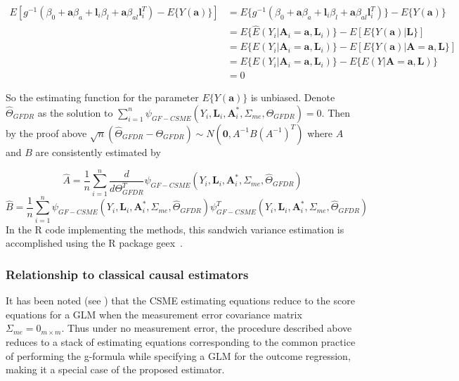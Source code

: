 \documentclass[12pt]{article}
\begin{document}
\begin{align*}
E[g^{-1}(\beta_{0} + \bm{a}\beta_{a} + \bm{l}_{i}\beta_{l} +
        \bm{a}\beta_{al}\bm{l}_{i}^{T}) - E \{ Y(\bm{a}) \}] &= E \{ g^{-1}(\beta_{0} + \bm{a}\beta_{a} + \bm{l}_{i}\beta_{l} +
        \bm{a}\beta_{al}\bm{l}_{i}^{T}) \} - E \{ Y(\bm{a}) \} \\
&= E \{ \hat{E}(Y_{i} | \bm{A}_{i} = \bm{a}, \bm{L}_{i}) \} - E[E \{ Y(\bm{a}) | \bm{L} \}] \\
&= E \{ E(Y_{i} | \bm{A}_{i} = \bm{a}, \bm{L}_{i}) \} - E[E \{ Y(\bm{a}) | \bm{A} = \bm{a}, \bm{L} \}] \\
&= E \{ E(Y_{i} | \bm{A}_{i} = \bm{a}, \bm{L}_{i}) \} - E\{ E(Y | \bm{A} = \bm{a}, \bm{L})\} \\
&=0
\end{align*}

So the estimating function for the parameter $E \{ Y(\bm{a}) \}$ is unbiased. Denote $\hat{\Theta}_{GFDR}$ as the solution to $\sum_{i=1}^{n} \psi_{GF-CSME}(Y_{i}, \bm{L}_{i}, \bm{A}^{*}_{i}, \Sigma_{me}, \hat{\Theta}_{GFDR}) = 0$. Then by the proof above $\sqrt{n}(\hat{\Theta}_{GFDR} - \Theta_{GFDR}) \sim N(\textbf{0}, A^{-1}B(A^{-1})^{T})$ where $A$ and $B$ are consistently estimated by

\begin{equation*}
\hat{A} = \frac{1}{n} \sum_{i=1}^{n} \frac{d}{d\Theta_{GFDR}^{T}} \psi_{GF-CSME}(Y_{i}, \bm{L}_{i}, \bm{A}^{*}_{i}, \Sigma_{me}, \hat{\Theta}_{GFDR})
\end{equation*}
\begin{equation*}
\hat{B} = \frac{1}{n} \sum_{i=1}^{n} \psi_{GF-CSME}(Y_{i}, \bm{L}_{i}, \bm{A}^{*}_{i}, \Sigma_{me}, \hat{\Theta}_{GFDR}) \psi^{T}_{GF-CSME}(Y_{i}, \bm{L}_{i}, \bm{A}^{*}_{i}, \Sigma_{me}, \hat{\Theta}_{GFDR})
\end{equation*}
In the R code implementing the methods, this sandwich variance estimation is accomplished using the R package geex~\citep{saul2017}.

\subsubsection{Relationship to classical causal estimators}

It has been noted (see \citet{carroll2006}) that the CSME estimating equations reduce to the score equations for a GLM when the measurement error covariance matrix $\Sigma_{me} = 0_{m \times m}$. Thus under no measurement error, the procedure described above reduces to a stack of estimating equations corresponding to the common practice of performing the g-formula while specifying a GLM for the outcome regression, making it a special case of the proposed estimator.
\end{document}
